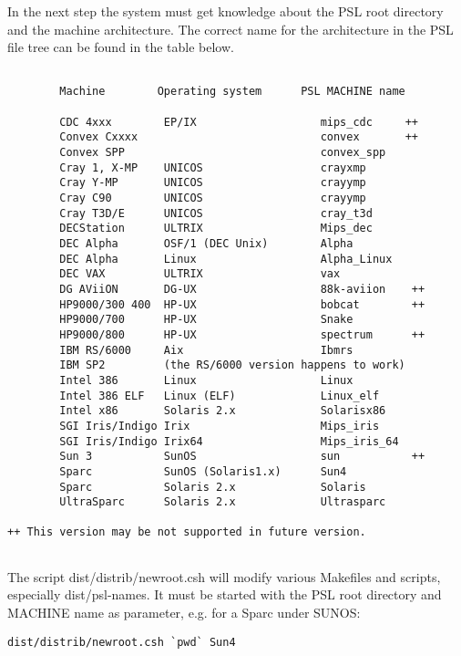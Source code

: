 In the next step the system must get knowledge about the PSL root directory
and the machine architecture. The correct name for the architecture in the
PSL file tree can be found in the table below.  
\begin{verbatim}

        Machine        Operating system      PSL MACHINE name 
        
        CDC 4xxx        EP/IX                   mips_cdc     ++
        Convex Cxxxx                            convex       ++
        Convex SPP                              convex_spp
        Cray 1, X-MP    UNICOS                  crayxmp      
        Cray Y-MP       UNICOS                  crayymp
        Cray C90        UNICOS                  crayymp
        Cray T3D/E      UNICOS                  cray_t3d
        DECStation      ULTRIX                  Mips_dec
        DEC Alpha       OSF/1 (DEC Unix)        Alpha
        DEC Alpha       Linux                   Alpha_Linux
        DEC VAX         ULTRIX                  vax
        DG AViiON       DG-UX                   88k-aviion    ++
        HP9000/300 400  HP-UX                   bobcat        ++
        HP9000/700      HP-UX                   Snake
        HP9000/800      HP-UX                   spectrum      ++
        IBM RS/6000     Aix                     Ibmrs	
        IBM SP2         (the RS/6000 version happens to work)
        Intel 386       Linux                   Linux
        Intel 386 ELF   Linux (ELF)             Linux_elf
        Intel x86       Solaris 2.x             Solarisx86
        SGI Iris/Indigo Irix                    Mips_iris
        SGI Iris/Indigo Irix64                  Mips_iris_64
        Sun 3           SunOS                   sun           ++
        Sparc           SunOS (Solaris1.x)      Sun4
        Sparc           Solaris 2.x             Solaris
        UltraSparc      Solaris 2.x             Ultrasparc

++ This version may be not supported in future version.
        
\end{verbatim}

The script dist/distrib/newroot.csh will modify various Makefiles and
scripts, especially dist/psl-names. It must be started with the
PSL root directory and MACHINE name as parameter, e.g. for a Sparc under
SUNOS:

\begin{verbatim}
dist/distrib/newroot.csh `pwd` Sun4
\end{verbatim}

